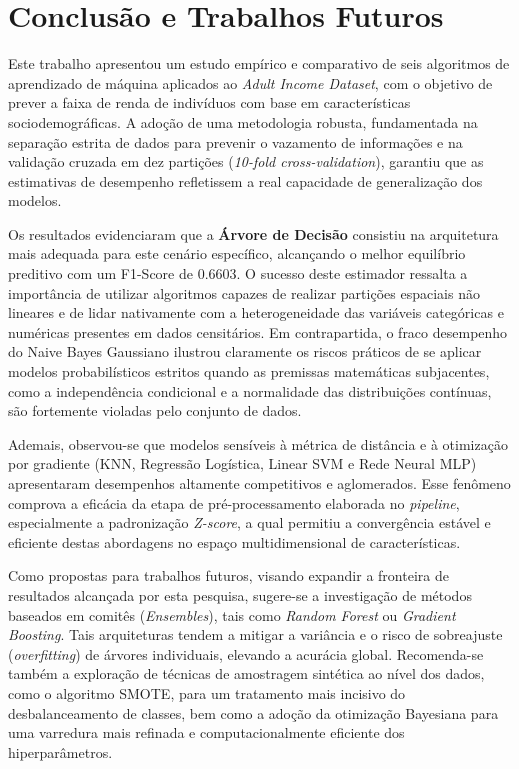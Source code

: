 \section{Conclusão e Trabalhos Futuros}

Este trabalho apresentou um estudo empírico e comparativo de seis algoritmos de aprendizado de máquina aplicados ao \textit{Adult Income Dataset}, com o objetivo de prever a faixa de renda de indivíduos com base em características sociodemográficas. A adoção de uma metodologia robusta, fundamentada na separação estrita de dados para prevenir o vazamento de informações e na validação cruzada em dez partições (\textit{10-fold cross-validation}), garantiu que as estimativas de desempenho refletissem a real capacidade de generalização dos modelos.

Os resultados evidenciaram que a \textbf{Árvore de Decisão} consistiu na arquitetura mais adequada para este cenário específico, alcançando o melhor equilíbrio preditivo com um F1-Score de 0.6603. O sucesso deste estimador ressalta a importância de utilizar algoritmos capazes de realizar partições espaciais não lineares e de lidar nativamente com a heterogeneidade das variáveis categóricas e numéricas presentes em dados censitários. Em contrapartida, o fraco desempenho do Naive Bayes Gaussiano ilustrou claramente os riscos práticos de se aplicar modelos probabilísticos estritos quando as premissas matemáticas subjacentes, como a independência condicional e a normalidade das distribuições contínuas, são fortemente violadas pelo conjunto de dados.

Ademais, observou-se que modelos sensíveis à métrica de distância e à otimização por gradiente (KNN, Regressão Logística, Linear SVM e Rede Neural MLP) apresentaram desempenhos altamente competitivos e aglomerados. Esse fenômeno comprova a eficácia da etapa de pré-processamento elaborada no \textit{pipeline}, especialmente a padronização \textit{Z-score}, a qual permitiu a convergência estável e eficiente destas abordagens no espaço multidimensional de características.

Como propostas para trabalhos futuros, visando expandir a fronteira de resultados alcançada por esta pesquisa, sugere-se a investigação de métodos baseados em comitês (\textit{Ensembles}), tais como \textit{Random Forest} ou \textit{Gradient Boosting}. Tais arquiteturas tendem a mitigar a variância e o risco de sobreajuste (\textit{overfitting}) de árvores individuais, elevando a acurácia global. Recomenda-se também a exploração de técnicas de amostragem sintética ao nível dos dados, como o algoritmo SMOTE, para um tratamento mais incisivo do desbalanceamento de classes, bem como a adoção da otimização Bayesiana para uma varredura mais refinada e computacionalmente eficiente dos hiperparâmetros.
\clearpage